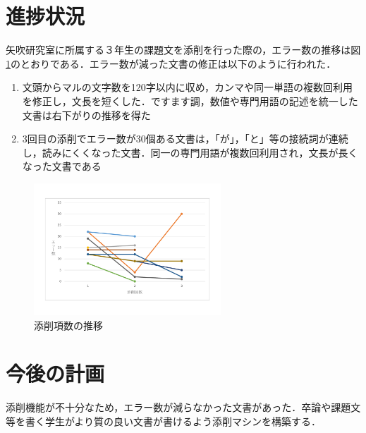 \documentclass[uplatex,twocolumn,dvipdfmx]{jsarticle}
\begin{document}
\section{進捗状況}
矢吹研究室に所属する３年生の課題文を添削を行った際の，エラー数の推移は図\ref{conf}のとおりである．エラー数が減った文書の修正は以下のように行われた．

\begin{enumerate}
 \item 文頭からマルの文字数を120字以内に収め，カンマや同一単語の複数回利用を修正し，文長を短くした．ですます調，数値や専門用語の記述を統一した文書は右下がりの推移を得た
 \item 3回目の添削でエラー数が30個ある文書は，「が」，「と」等の接続詞が連続し，読みにくくなった文書．同一の専門用語が複数回利用され，文長が長くなった文書である
\end{enumerate}

\begin{figure}[h]
\centering
\includegraphics[width=7cm,clip]{images.pdf}
\caption{添削項数の推移}\label{conf}
\end{figure}

\section{今後の計画}
添削機能が不十分なため，エラー数が減らなかった文書があった．卒論や課題文等を書く学生がより質の良い文書が書けるよう添削マシンを構築する．


\end{document}
